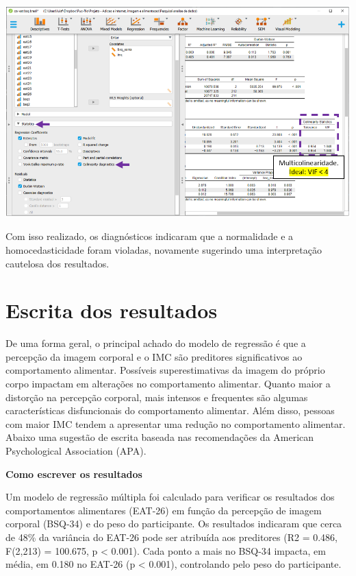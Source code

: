 \documentclass[
]{book}
\begin{document}
\includegraphics{./img/cap_reg_multipla_colinearidade2_jasp.png}

Com isso realizado, os diagnósticos indicaram que a normalidade e a homocedasticidade foram violadas, novamente sugerindo uma interpretação cautelosa dos resultados.

\hypertarget{escrita-dos-resultados-13}{%
\section{Escrita dos resultados}\label{escrita-dos-resultados-13}}

De uma forma geral, o principal achado do modelo de regressão é que a percepção da imagem corporal e o IMC são preditores significativos ao comportamento alimentar. Possíveis superestimativas da imagem do próprio corpo impactam em alterações no comportamento alimentar. Quanto maior a distorção na percepção corporal, mais intensos e frequentes são algumas características disfuncionais do comportamento alimentar. Além disso, pessoas com maior IMC tendem a apresentar uma redução no comportamento alimentar. Abaixo uma sugestão de escrita baseada nas recomendações da American Psychological Association (APA).

\begin{writing}
\textbf{Como escrever os resultados}

Um modelo de regressão múltipla foi calculado para verificar os
resultados dos comportamentos alimentares (EAT-26) em função da
percepção de imagem corporal (BSQ-34) e do peso do participante. Os
resultados indicaram que cerca de 48\% da variância do EAT-26 pode ser
atribuída aos preditores (R2 = 0.486, F(2,213) = 100.675, p \textless{}
0.001). Cada ponto a mais no BSQ-34 impacta, em média, em 0.180 no
EAT-26 (p \textless{} 0.001), controlando pelo peso do participante.
\end{writing}
\end{document}
